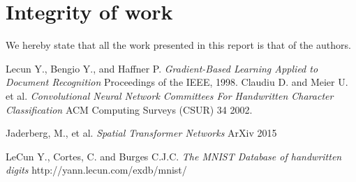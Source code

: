 \documentclass[conference]{IEEEtran}
\begin{document}
\section{Integrity of work}
We hereby state that all the work presented in this report is that of the authors.
\begin{thebibliography}{9}

Lecun Y., Bengio Y., and Haffner P.
 \emph{Gradient-Based Learning Applied to Document Recognition}
 Proceedings of the IEEE,
 1998.
 Claudiu D. and Meier U. et al.
  \emph{Convolutional Neural Network Committees For Handwritten Character
Classification}
  ACM Computing Surveys (CSUR) 34
  2002.

 Jaderberg, M., et al.
  \emph{Spatial Transformer Networks}
  ArXiv
  2015

LeCun Y., Cortes, C. and Burges C.J.C.
	\emph{The MNIST Database of handwritten digits}
	http://yann.lecun.com/exdb/mnist/
\end{thebibliography}
\end{document}
